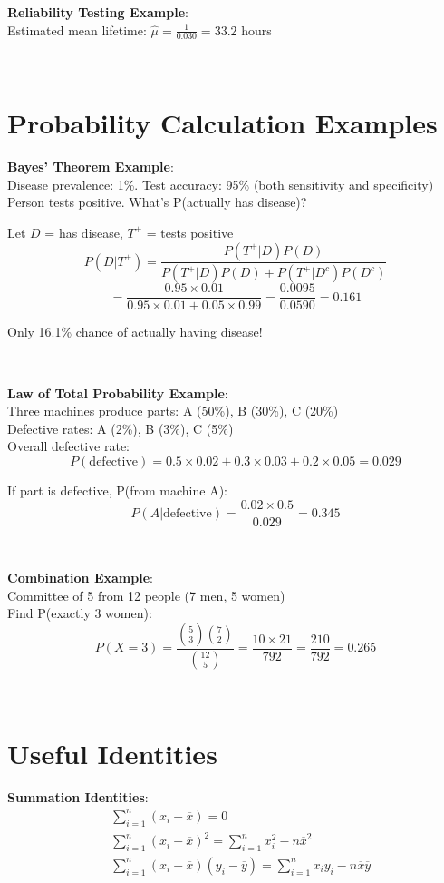 \documentclass{article}
\newenvironment{cheatformula}[1][Title]{
    \begin{minipage}{\linewidth}
    \textbf{#1}:\\
}{
    \end{minipage}\\[2ex]
}
\begin{document}
\begin{multicols*}{2}
\begin{cheatformula}[Reliability Testing Example]
    Estimated mean lifetime: $\hat{\mu} = \frac{1}{0.030} = 33.2$ hours
\end{cheatformula}

\section{Probability Calculation Examples}

\begin{cheatformula}[Bayes' Theorem Example]
    Disease prevalence: 1\%. Test accuracy: 95\% (both sensitivity and specificity)\\
    Person tests positive. What's P(actually has disease)?
    
    Let $D$ = has disease, $T^+$ = tests positive\\
    $$P(D|T^+) = \frac{P(T^+|D)P(D)}{P(T^+|D)P(D) + P(T^+|D^c)P(D^c)}$$
    $$= \frac{0.95 \times 0.01}{0.95 \times 0.01 + 0.05 \times 0.99} = \frac{0.0095}{0.0590} = 0.161$$
    
    Only 16.1\% chance of actually having disease!
\end{cheatformula}

\begin{cheatformula}[Law of Total Probability Example]
    Three machines produce parts: A (50\%), B (30\%), C (20\%)\\
    Defective rates: A (2\%), B (3\%), C (5\%)\\
    
    Overall defective rate:
    $$P(\text{defective}) = 0.5 \times 0.02 + 0.3 \times 0.03 + 0.2 \times 0.05 = 0.029$$
    
    If part is defective, P(from machine A):
    $$P(A|\text{defective}) = \frac{0.02 \times 0.5}{0.029} = 0.345$$
\end{cheatformula}

\begin{cheatformula}[Combination Example]
    Committee of 5 from 12 people (7 men, 5 women)\\
    Find P(exactly 3 women):
    $$P(X = 3) = \frac{\binom{5}{3}\binom{7}{2}}{\binom{12}{5}} = \frac{10 \times 21}{792} = \frac{210}{792} = 0.265$$
\end{cheatformula}

\section{Useful Identities}

\begin{cheatformula}[Summation Identities]
    \begin{align*}
        &\sum_{i=1}^n (x_i - \overline{x}) = 0\\
        &\sum_{i=1}^n (x_i - \overline{x})^2 = \sum_{i=1}^n x_i^2 - n\overline{x}^2\\
        &\sum_{i=1}^n (x_i - \overline{x})(y_i - \overline{y}) = \sum_{i=1}^n x_i y_i - n\overline{x}\overline{y}
    \end{align*}
\end{cheatformula}


\end{multicols*}
\end{document}
